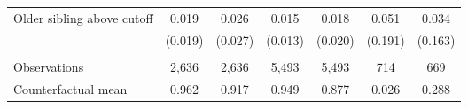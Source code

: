 {{\begin{tabular}{lcccccc}
Older sibling above cutoff&       0.019   &       0.026   &       0.015   &       0.018   &       0.051   &       0.034   \\
                    &     (0.019)   &     (0.027)   &     (0.013)   &     (0.020)   &     (0.191)   &     (0.163)   \\
                    &               &               &               &               &               &               \\
Observations        &       2,636   &       2,636   &       5,493   &       5,493   &         714   &         669   \\
Counterfactual mean &       0.962   &       0.917   &       0.949   &       0.877   &       0.026   &       0.288   \\
 

\bottomrule
\end{tabular}
}
}

